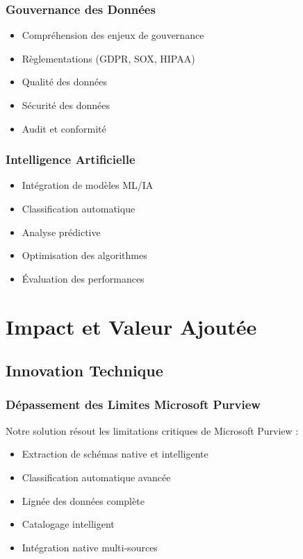 \documentclass[12pt,a4paper]{article}
\begin{document}
\subsubsection{Gouvernance des Données}
\begin{itemize}
    \item Compréhension des enjeux de gouvernance
    \item Règlementations (GDPR, SOX, HIPAA)
    \item Qualité des données
    \item Sécurité des données
    \item Audit et conformité
\end{itemize}

\subsubsection{Intelligence Artificielle}
\begin{itemize}
    \item Intégration de modèles ML/IA
    \item Classification automatique
    \item Analyse prédictive
    \item Optimisation des algorithmes
    \item Évaluation des performances
\end{itemize}

\section{Impact et Valeur Ajoutée}

\subsection{Innovation Technique}

\subsubsection{Dépassement des Limites Microsoft Purview}
Notre solution résout les limitations critiques de Microsoft Purview :
\begin{itemize}
    \item Extraction de schémas native et intelligente
    \item Classification automatique avancée
    \item Lignée des données complète
    \item Catalogage intelligent
    \item Intégration native multi-sources
\end{itemize}
\end{document}
